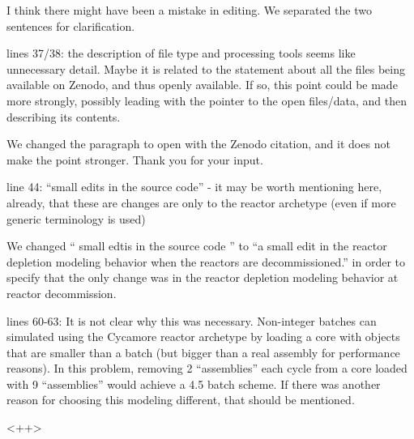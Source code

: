 \documentclass[answers,11pt]{exam}
\begin{document}
\begin{questions}
        \begin{solution}
        I think there might have been a mistake in editing.
        We separated the two sentences for clarification.
        \end{solution}

        \question lines 37/38: the description of file type and processing 
        tools seems like unnecessary detail.  Maybe it is related to the 
        statement about all the files being available on Zenodo, and thus 
        openly available.  If so, this point could be made more strongly, 
        possibly leading with the pointer to the open files/data, and then 
        describing its contents.

        \begin{solution}
        We changed the paragraph to open with the Zenodo citation, and
        it does not make the point stronger. Thank you for your input.
        \end{solution}

        \question line 44: ``small edits in the source code'' - it may be worth 
        mentioning here, already, that these are changes are only to the 
        reactor archetype (even if more generic terminology is used)

        \begin{solution}
        We changed
        `` small edtis in the source code '' to ``a small edit in the reactor depletion modeling behavior
        when the reactors are decommissioned.'' in order to specify that the only
        change was in the reactor depletion modeling behavior at reactor decommission.
        \end{solution}

        \question lines 60-63: It is not clear why this was necessary. 
        Non-integer batches can simulated using the Cycamore reactor archetype 
        by loading a core with objects that are smaller than a batch (but 
        bigger than a real assembly for performance reasons).  In this problem, 
        removing 2 ``assemblies'' each cycle from a core loaded with 9 
        ``assemblies'' would achieve a 4.5 batch scheme.  If there was another 
        reason for choosing this modeling different, that should be mentioned.

        \begin{solution}
        <++>
        \end{solution}


\end{questions}
\end{document}
